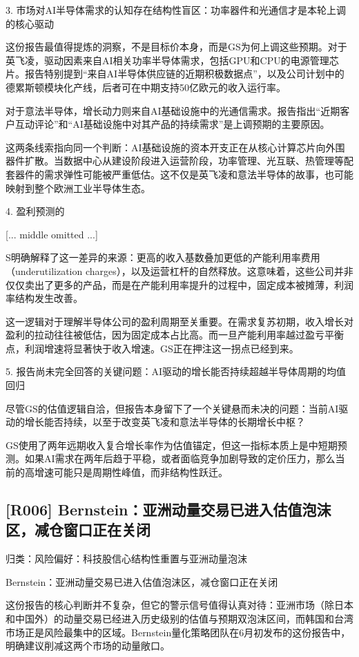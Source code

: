 \documentclass[11pt]{ctexart}
\begin{document}
3. 市场对AI半导体需求的认知存在结构性盲区：功率器件和光通信才是本轮上调的核心驱动

这份报告最值得提炼的洞察，不是目标价本身，而是GS为何上调这些预期。对于英飞凌，驱动因素来自AI相关功率半导体需求，包括GPU和CPU的电源管理芯片。报告特别提到“来自AI半导体供应链的近期积极数据点”，以及公司计划中的德累斯顿模块化产线，后者可在中期支持50亿欧元的收入运行率。

对于意法半导体，增长动力则来自AI基础设施中的光通信需求。报告指出“近期客户互动评论”和“AI基础设施中对其产品的持续需求”是上调预期的主要原因。

这两条线索指向同一个判断：AI基础设施的资本开支正在从核心计算芯片向外围器件扩散。当数据中心从建设阶段进入运营阶段，功率管理、光互联、热管理等配套器件的需求弹性可能被严重低估。这不仅是英飞凌和意法半导体的故事，也可能映射到整个欧洲工业半导体生态。

4. 盈利预测的

[... middle omitted ...]

S明确解释了这一差异的来源：更高的收入基数叠加更低的产能利用率费用（underutilization charges），以及运营杠杆的自然释放。这意味着，这些公司并非仅仅卖出了更多的产品，而是在产能利用率提升的过程中，固定成本被摊薄，利润率结构发生改善。

这一逻辑对于理解半导体公司的盈利周期至关重要。在需求复苏初期，收入增长对盈利的拉动往往被低估，因为固定成本占比高。而一旦产能利用率越过盈亏平衡点，利润增速将显著快于收入增速。GS正在押注这一拐点已经到来。

5. 报告尚未完全回答的关键问题：AI驱动的增长能否持续超越半导体周期的均值回归

尽管GS的估值逻辑自洽，但报告本身留下了一个关键悬而未决的问题：当前AI驱动的增长能否持续，以至于改变英飞凌和意法半导体的长期增长中枢？

GS使用了两年远期收入复合增长率作为估值锚定，但这一指标本质上是中短期预测。如果AI需求在两年后趋于平稳，或者面临竞争加剧导致的定价压力，那么当前的高增速可能只是周期性峰值，而非结构性跃迁。

\subsection{[R006] Bernstein：亚洲动量交易已进入估值泡沫区，减仓窗口正在关闭}
{\small\color{refgray}归类：风险偏好：科技股信心结构性重置与亚洲动量泡沫}

Bernstein：亚洲动量交易已进入估值泡沫区，减仓窗口正在关闭

这份报告的核心判断并不复杂，但它的警示信号值得认真对待：亚洲市场（除日本和中国外）的动量交易已经进入历史级别的估值与预期双泡沫区间，而韩国和台湾市场正是风险最集中的区域。Bernstein量化策略团队在6月初发布的这份报告中，明确建议削减这两个市场的动量敞口。
\end{document}
